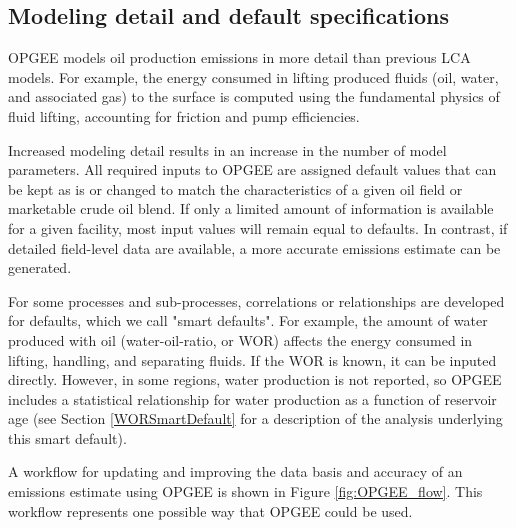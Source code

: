 \documentclass[11pt]{report}
\begin{document}
\subsection{Modeling detail and default specifications}

OPGEE models oil production emissions in more detail than previous LCA models. For example, the energy consumed in lifting produced fluids (oil, water, and associated gas) to the surface is computed using the fundamental physics of fluid lifting, accounting for friction and pump efficiencies. 

Increased modeling detail results in an increase in the number of model parameters. All required inputs to OPGEE are assigned default values that can be kept as is or changed to match the characteristics of a given oil field or marketable crude oil blend. If only a limited amount of information is available for a given facility, most input values will remain equal to defaults. In contrast, if detailed field-level data are available, a more accurate emissions estimate can be generated.

For some processes and sub-processes, correlations or relationships are developed for defaults, which we call "smart defaults". For example, the amount of water produced with oil (water-oil-ratio, or WOR) affects the energy consumed in lifting, handling, and separating fluids. If the WOR is known, it can be inputed directly. However, in some regions, water production is not reported, so OPGEE includes a statistical relationship for water production as a function of reservoir age (see Section \ref{WORSmartDefault} for a description of the analysis underlying this smart default).

A workflow for updating and improving the data basis and accuracy of an emissions estimate using OPGEE is shown in Figure \ref{fig:OPGEE_flow}. This workflow represents one possible way that OPGEE could be used.
\end{document}
